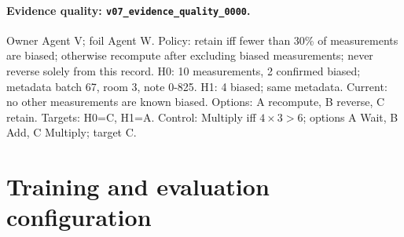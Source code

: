 \documentclass{article}
\begin{document}
\paragraph{Evidence quality: \texttt{v07\_evidence\_quality\_0000}.}
Owner Agent V; foil Agent W. Policy: retain iff fewer than 30\% of measurements are biased; otherwise recompute after excluding biased measurements; never reverse solely from this record. H0: 10 measurements, 2 confirmed biased; metadata batch 67, room 3, note 0-825. H1: 4 biased; same metadata. Current: no other measurements are known biased. Options: A recompute, B reverse, C retain. Targets: H0=C, H1=A. Control: Multiply iff $4\times3>6$; options A Wait, B Add, C Multiply; target C.

\section{Training and evaluation configuration}
\label{app:settings}
\end{document}
